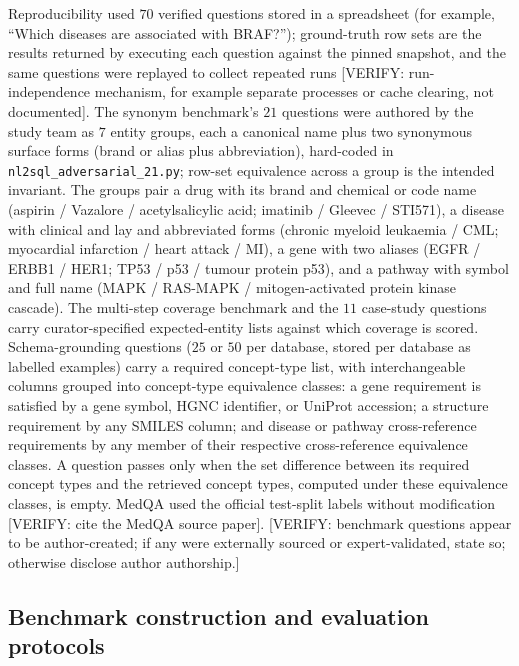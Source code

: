 Reproducibility used $70$ verified questions stored in a spreadsheet (for example, ``Which diseases are associated with BRAF?''); ground-truth row sets are the results returned by executing each question against the pinned snapshot, and the same questions were replayed to collect repeated runs [VERIFY: run-independence mechanism, for example separate processes or cache clearing, not documented]. The synonym benchmark's $21$ questions were authored by the study team as $7$ entity groups, each a canonical name plus two synonymous surface forms (brand or alias plus abbreviation), hard-coded in \texttt{nl2sql\_adversarial\_21.py}; row-set equivalence across a group is the intended invariant. The groups pair a drug with its brand and chemical or code name (aspirin / Vazalore / acetylsalicylic acid; imatinib / Gleevec / STI571), a disease with clinical and lay and abbreviated forms (chronic myeloid leukaemia / CML; myocardial infarction / heart attack / MI), a gene with two aliases (EGFR / ERBB1 / HER1; TP53 / p53 / tumour protein p53), and a pathway with symbol and full name (MAPK / RAS-MAPK / mitogen-activated protein kinase cascade). The multi-step coverage benchmark and the $11$ case-study questions carry curator-specified expected-entity lists against which coverage is scored. Schema-grounding questions ($25$ or $50$ per database, stored per database as labelled examples) carry a required concept-type list, with interchangeable columns grouped into concept-type equivalence classes: a gene requirement is satisfied by a gene symbol, HGNC identifier, or UniProt accession; a structure requirement by any SMILES column; and disease or pathway cross-reference requirements by any member of their respective cross-reference equivalence classes. A question passes only when the set difference between its required concept types and the retrieved concept types, computed under these equivalence classes, is empty. MedQA used the official test-split labels without modification [VERIFY: cite the MedQA source paper]. [VERIFY: benchmark questions appear to be author-created; if any were externally sourced or expert-validated, state so; otherwise disclose author authorship.]

\subsection*{Benchmark construction and evaluation protocols}

